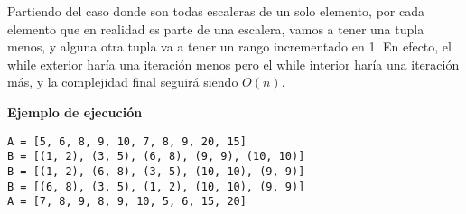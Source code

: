 Partiendo del caso donde son todas escaleras de un solo elemento, por cada elemento que en realidad es parte de una escalera, vamos a tener una tupla menos, y alguna otra tupla va a tener un rango incrementado en 1. En efecto, el while exterior haría una iteración menos pero el while interior haría una iteración más, y la complejidad final seguirá siendo $O(n)$.

\textbf{Ejemplo de ejecución}

\begin{lstlisting}
A = [5, 6, 8, 9, 10, 7, 8, 9, 20, 15]
B = [(1, 2), (3, 5), (6, 8), (9, 9), (10, 10)]
B = [(1, 2), (6, 8), (3, 5), (10, 10), (9, 9)]
B = [(6, 8), (3, 5), (1, 2), (10, 10), (9, 9)]
A = [7, 8, 9, 8, 9, 10, 5, 6, 15, 20]
\end{lstlisting}
